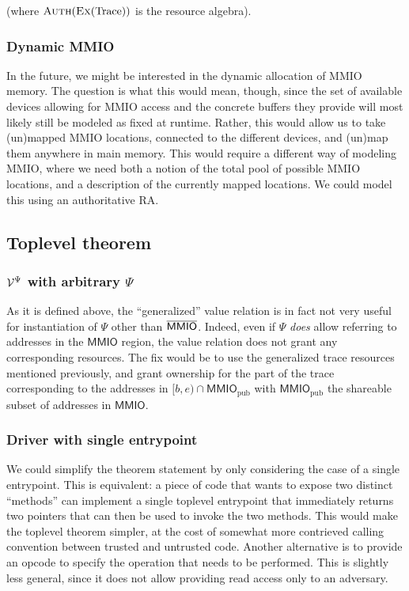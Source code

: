 \documentclass{article}
\newcommand{\X}[1]{\ensuremath{\mathrm{#1}}}
\newcommand{\Sf}[1]{\ensuremath{\mathsf{#1}}}
\newcommand{\MMIO}{\Sf{MMIO}\xspace}
\begin{document}
(where $\authm(\exm(\X{Trace}))$ is the resource algebra).

\subsubsection{Dynamic MMIO}
\label{rk:resources:dynamic_mmio}

In the future, we might be interested in the dynamic allocation of MMIO memory.
The question is what this would mean, though, since the set of available devices
allowing for MMIO access and the concrete buffers they provide will most likely
still be modeled as fixed at runtime.
Rather, this would allow us to take (un)mapped MMIO locations, connected to the different devices, and (un)map them anywhere in main memory.
This would require a different way of modeling MMIO, where we need both a notion
of the total pool of possible MMIO locations, and a description of the currently
mapped locations. We could model this using an authoritative RA.

\subsection{Toplevel theorem}

\subsubsection{$\mathcal{V}^\Psi$ with arbitrary $\Psi$}
\label{rk:toplevel:v_psi}

As it is defined above, the ``generalized'' value relation
is in fact not very useful for instantiation of $\Psi$ other than $\notMMIO$.
Indeed, even if $\Psi$ \emph{does} allow referring to addresses in the $\MMIO$
region, the value relation does not grant any corresponding resources. The fix
would be to use the generalized trace resources mentioned previously, and grant
ownership for the part of the trace corresponding to the addresses in
$[b,e) \cap \MMIO_{\X{pub}}$ with $\MMIO_{\X{pub}}$ the shareable subset of
addresses in \MMIO.

\subsubsection{Driver with single entrypoint}
\label{rk:toplevel:single_entrypoint}

We could simplify the theorem statement by only considering the case of a
single entrypoint. This is equivalent: a piece of code that wants to expose
two distinct ``methods'' can implement a single toplevel entrypoint that
immediately returns two pointers that can then be used to invoke the two
methods.
%
This would make the toplevel theorem simpler, at the cost of somewhat more
contrieved calling convention between trusted and untrusted code.
Another alternative is to provide an opcode to specify the operation that
needs to be performed.
This is slightly less general, since it does not allow providing read access
only to an adversary.
\end{document}
